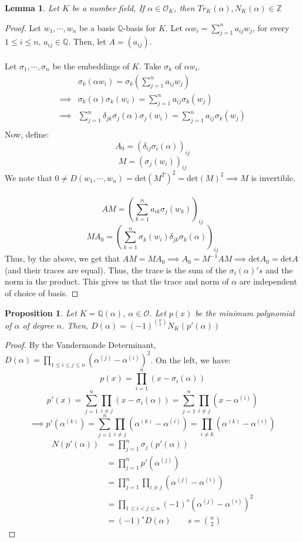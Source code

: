 \documentclass{article}
\newcommand{\air}{\mathcal{O}_K}
\newcommand{\Q}{\mathbb{Q}}
\newcommand{\Z}{\mathbb{Z}}
\newtheorem{proposition}{Proposition}
\newtheorem{lemma}{Lemma}
\begin{document}
\begin{lemma}
Let $K$ be a number field, If $\alpha\in\air$, then $Tr_K(\alpha),N_K(\alpha)\in\Z$
\end{lemma}
\begin{proof}
Let $w_1,\cdots, w_n$ be a basis $\Q$-basis for $K$. Let $\alpha w_i=\displaystyle\sum_{j=1}^na_{ij}w_j$, for every $1\leq i\leq n$, $a_{ij}\in\Q$. Then, let $A=(a_{ij})$.
\\
\\
Let $\sigma_1,\cdots, \sigma_n$ be the embeddings of $K$. Take $\sigma_k$ of $\alpha w_i$.
\begin{align*}
    &\sigma_k(\alpha w_i) = \sigma_k\left(\sum_{j=1}^n a_{ij} w_j\right)\\
    \implies &\sigma_k(\alpha)\sigma_k(w_i) =\sum_{j=1}^n a_{ij}\sigma_k(w_j)\\
    \implies &\sum_{j=1}^n \delta_{jk}\sigma_j(\alpha)\sigma_j(w_i)=\sum_{j=1}^n a_{ij}\sigma_k(w_j)\\
\end{align*}
Now, define:
$$A_0 = (\delta_{ij}\sigma_i(\alpha))_{ij}$$
$$M= (\sigma_j(w_i))_{ij}$$
We note that $0\neq D(w_1,\cdots, w_n) = \text{det}(M^T)^2 = \text{det}(M)^2 \implies M$ is invertible.\\
\\
$$AM=\left(\sum_{k=1}^n a_{ik}\sigma_j(w_k)\right)_{ij}$$
$$MA_0 = \left(\sum_{k=1}^n\sigma_k(w_i)\delta_{jk}\sigma_k(\alpha)\right)_{ij}$$
Thus, by the above, we get that $AM=MA_0\implies A_0 = M^{-1}AM\implies \text{det}A_0=\text{det} A$ (and their traces are equal). Thus, the trace is the sum of the $\sigma_i(\alpha)'s$ and the norm ia the product. This gives us that the trace and norm of $\alpha$ are independent of choice of basis.
\end{proof}
\newpage
\begin{proposition}
Let $K=\Q(\alpha)$, $\alpha\in\mathcal{O}$. Let $p(x)$ be the minimum polynomial of $\alpha$ of degree $n$. Then, $D(\alpha)=(-1)^{{{n}\choose{2}}} N_K(p'(\alpha))$
\end{proposition}
\begin{proof}
By the Vandermonde Determinant, $D(\alpha)=\displaystyle\prod_{1\leq i\leq j\leq n}(\alpha^{(j)}-\alpha^{(i)})^2$. On the left, we have:
$$p(x)=\prod_{i=1}^n (x-\sigma_i(\alpha))$$
$$p'(x)=\sum_{j=1}^n \prod_{i\neq j} (x-\sigma_i(\alpha)) =\sum_{j=1}^n \prod_{i\neq j} (x-\alpha^{(i)})$$
$$\implies p'(\alpha^{(k)}) = \sum_{j=1}^n \prod_{i\neq j} (\alpha^{(k)}-\alpha^{(i)})=\prod_{i\neq k}(\alpha^{(k)}-\alpha^{(i)})$$
\begin{align*}
    N(p'(\alpha))&=\prod_{j=1}^n \sigma_j(p'(\alpha))\\
    &=\prod_{j=1}^n p'(\alpha^{(j)})\\
    &=\prod_{j=1}^n\prod_{i\neq j} (\alpha^{(j)}-\alpha^{(i)})\\
    &=\prod_{1\leq i < j\leq n} (-1)^s(\alpha^{(j)}-\alpha^{(i)})^2\\
    &=(-1)^sD(\alpha)\qquad s={{n}\choose {2}}
\end{align*}
\end{proof}
\end{document}
